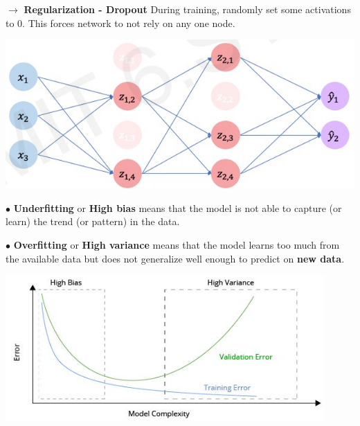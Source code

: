 \documentclass[letterpaper, 10.5pt,landscape]{article}
\begin{document}
\begin{multicols*}{3}
$\rightarrow$ \textbf{Regularization - Dropout} During training, randomly set some activations to 0. This forces network to not rely on any one node.
\vspace{-3pt}
\begin{center}
    \begin{minipage}{0.60\linewidth}
        \includegraphics[width=\textwidth]{figures/regularization_dropout.PNG}
    \end{minipage}
\end{center}
\vspace{-3pt}


$\bullet$ \textbf{Underfitting} or \textbf{High bias} means that the model is not able to capture (or learn) the trend (or pattern) in the data.

$\bullet$ \textbf{Overfitting} or \textbf{High variance} means that the model learns too much from the available data but does not generalize well enough to predict on \textbf{new data}.


\vspace{-3pt}
\begin{center}
    \begin{minipage}{0.8\linewidth}
        \includegraphics[width=\textwidth]{figures/Tradeoff_Learning_Curves.PNG}
    \end{minipage}
\end{center}
\vspace{-3pt}


\end{multicols*}
\end{document}
